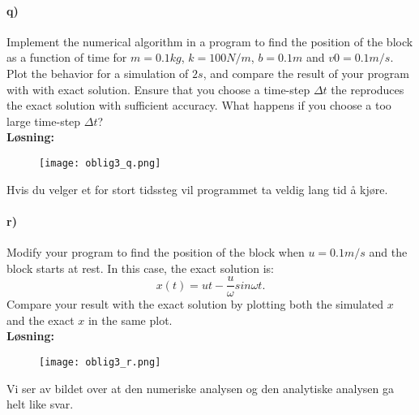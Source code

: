 \documentclass[11pt, A4paper,norsk]{article}
\begin{document}
		\paragraph{q)}
			\begin{flushleft}
Implement the numerical algorithm in a program to find the position of the block as a function of time for $m = 0.1kg$, $k = 100N/m$, $b = 0.1m$ and $v0 = 0.1m/s$. Plot the behavior for a simulation of $2s$, and compare the result of your program with with exact solution. Ensure that you choose a time-step $\Delta t$ the reproduces the exact solution with sufficient accuracy. What happens if you choose a too large time-step $\Delta t$? \\
\vspace{1mm}
\textbf{Løsning:} \\
\vspace{1mm}

				\begin{figure}[H]
\texttt{[image: oblig3\_q.png]}
				\end{figure}
Hvis du velger et for stort tidssteg vil programmet ta veldig lang tid å kjøre.
			\end{flushleft}













		\paragraph{r)}
			\begin{flushleft}
Modify your program to find the position of the block when $u = 0.1m/s$ and the block starts at rest. In this case, the exact solution is: $$x(t) = ut - \frac{u}{\omega} sin \omega t.$$ Compare your result with the exact solution by plotting both the simulated $x$ and the exact $x$ in the same plot. \\
\vspace{1mm}
\textbf{Løsning:} \\
\vspace{1mm}

				\begin{figure}[H]
\texttt{[image: oblig3\_r.png]}
				\end{figure}
Vi ser av bildet over at den numeriske analysen og den analytiske analysen ga helt like svar.
			\end{flushleft}
\end{document}

